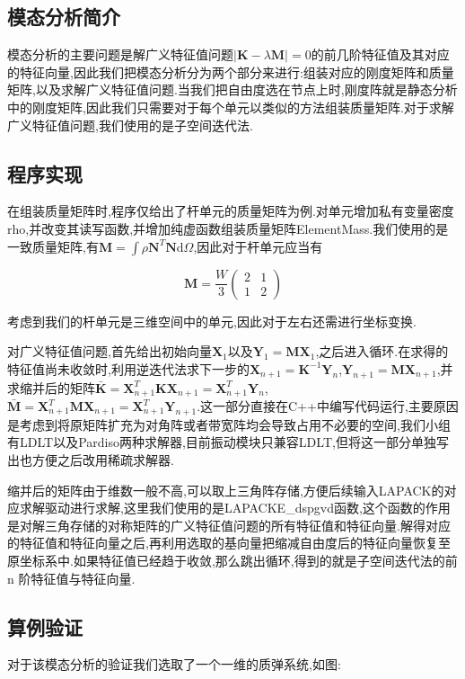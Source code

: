 
\subsection{模态分析简介}
模态分析的主要问题是解广义特征值问题$|\mathbf{K}-\lambda\mathbf{M}|=0$的前几阶特征值及其对应的特征向量,因此我们把模态分析分为两个部分来进行:组装对应的刚度矩阵和质量矩阵,以及求解广义特征值问题.当我们把自由度选在节点上时,刚度阵就是静态分析中的刚度矩阵,因此我们只需要对于每个单元以类似的方法组装质量矩阵.对于求解广义特征值问题,我们使用的是子空间迭代法.
\subsection{程序实现}
在组装质量矩阵时,程序仅给出了杆单元的质量矩阵为例.对单元增加私有变量密度rho,并改变其读写函数,并增加纯虚函数组装质量矩阵ElementMass.我们使用的是一致质量矩阵,有$\mathbf{M}=\int\rho\mathbf{N}^T\mathbf{N}\mathrm{d}\Omega$,因此对于杆单元应当有

\[
\mathbf{M}=\frac{W}{3}\left(\begin{array}{cc} 2&1\\1&2 \end{array} \right)
\]

考虑到我们的杆单元是三维空间中的单元,因此对于左右还需进行坐标变换.

对广义特征值问题,首先给出初始向量$\mathbf{X}_1$以及$\mathbf{Y}_1=\mathbf{M}\mathbf{X}_1$,之后进入循环.在求得的特征值尚未收敛时,利用逆迭代法求下一步的$\mathbf{X}_{n+1}=\mathbf{K}^{-1}\mathbf{Y}_n$,$\mathbf{Y}_{n+1}=\mathbf{M}\mathbf{X}_{n+1}$,并求缩并后的矩阵$\bar{\mathbf{K}}=\mathbf{X}_{n+1}^T\mathbf{K}\mathbf{X}_{n+1}=\mathbf{X}_{n+1}^T\mathbf{Y}_n$, $\bar{\mathbf{M}}=\mathbf{X}_{n+1}^T\mathbf{M}\mathbf{X}_{n+1}=\mathbf{X}_{n+1}^T\mathbf{Y}_{n+1}$.这一部分直接在C++中编写代码运行,主要原因是考虑到将原矩阵扩充为对角阵或者带宽阵均会导致占用不必要的空间,我们小组有LDLT以及Pardiso两种求解器,目前振动模块只兼容LDLT,但将这一部分单独写出也方便之后改用稀疏求解器.

缩并后的矩阵由于维数一般不高,可以取上三角阵存储,方便后续输入LAPACK的对应求解驱动进行求解,这里我们使用的是LAPACKE\_dspgvd函数,这个函数的作用是对解三角存储的对称矩阵的广义特征值问题的所有特征值和特征向量.解得对应的特征值和特征向量之后,再利用选取的基向量把缩减自由度后的特征向量恢复至原坐标系中.如果特征值已经趋于收敛,那么跳出循环,得到的就是子空间迭代法的前n 阶特征值与特征向量.

\subsection{算例验证}
对于该模态分析的验证我们选取了一个一维的质弹系统,如图:

